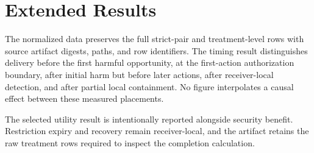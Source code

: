 \section{Extended Results}
\label{app:extended-results}



The normalized data preserves the full strict-pair and treatment-level rows with source artifact digests, paths, and row identifiers. The timing result distinguishes delivery before the first harmful opportunity, at the first-action authorization boundary, after initial harm but before later actions, after receiver-local detection, and after partial local containment. No figure interpolates a causal effect between these measured placements.







The selected utility result is intentionally reported alongside security benefit. Restriction expiry and recovery remain receiver-local, and the artifact retains the raw treatment rows required to inspect the completion calculation.
